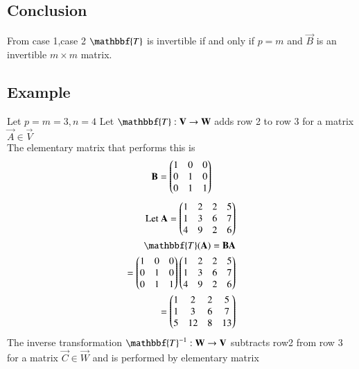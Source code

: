 \documentclass[journal,12pt,twocolumn]{IEEEtran}
\begin{document}
\subsection{Conclusion}
From case 1,case 2 $\mathbbf{T}$ is invertible if and only if $p=m$ and $\vec{B}$ is an invertible $m \times m$ matrix.
\subsection{Example}
Let $p=m=3 ,n=4$
Let $\mathbbf{T}:\vec{V} \rightarrow \vec{W}$ adds row 2 to row 3 for a matrix $\vec{A} \in \vec{V}$\\
The elementary matrix that performs this is
\begin{align}
    \mathbf{B}= \begin{pmatrix}1&0&0\\0&1&0\\0&1&1\end{pmatrix}
\end{align}
\begin{align}
    \text{Let }\vec{A}=\myvec{1&2&2&5\\1&3&6&7\\4&9&2&6}\\
    \mathbbf{T}(\vec{A})=\vec{B}\vec{A}\\=
    \myvec{1&0&0\\0&1&0\\0&1&1}\myvec{1&2&2&5\\1&3&6&7\\4&9&2&6}\\
    =\myvec{1&2&2&5\\1&3&6&7\\5&12&8&13}
\end{align}
The inverse transformation $\mathbbf{T}^{-1}:\vec{W} \rightarrow \vec{V}$ subtracts row2 from row 3 for a matrix $\vec{C} \in \vec{W}$ and is performed by elementary matrix
\end{document}

